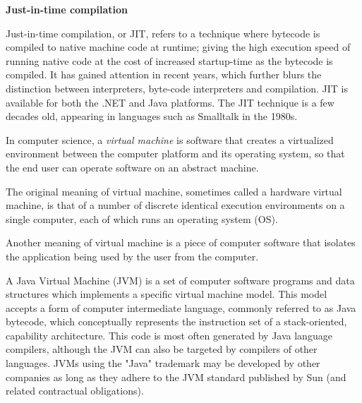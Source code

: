 \medskip\textbf{Just-in-time compilation}

Just-in-time compilation, or JIT, refers to a technique where bytecode is compiled to native machine code at runtime; giving the high execution speed of running native code at the cost of increased startup-time as the bytecode is compiled. It has gained attention in recent years, which further blurs the distinction between interpreters, byte-code interpreters and compilation. JIT is available for both the .NET and Java platforms. The JIT technique is a few decades old, appearing in languages such as Smalltalk in the 1980s.

In computer science, a \emph{virtual machine} is software that creates a virtualized environment between the computer platform and its operating system, so that the end user can operate software on an abstract machine.

The original meaning of virtual machine, sometimes called a hardware virtual machine, is that of a number of discrete identical execution environments on a single computer, each of which runs an operating system (OS).

Another meaning of virtual machine is a piece of computer software that isolates the application being used by the user from the computer.

A Java Virtual Machine (JVM) is a set of computer software programs and data structures which implements a specific virtual machine model. This model accepts a form of computer intermediate language, commonly referred to as Java bytecode, which conceptually represents the instruction set of a stack-oriented, capability architecture. This code is most often generated by Java language compilers, although the JVM can also be targeted by compilers of other languages. JVMs using the "Java" trademark may be developed by other companies as long as they adhere to the JVM standard published by Sun (and related contractual obligations).
